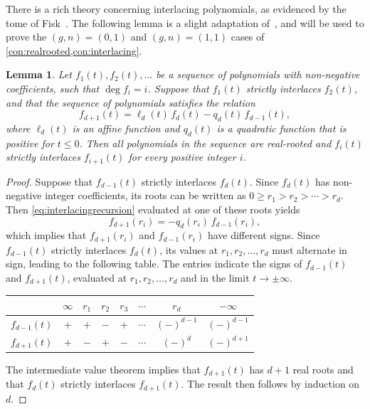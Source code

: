\documentclass[a4paper]{article}
\theoremstyle{plain}
\newtheorem{lemma}[theorem]{Lemma}
\numberwithin{theorem}{section}
\theoremstyle{definition}
\theoremstyle{remark}
\renewcommand{\leq}{\leqslant}
\renewcommand{\geq}{\geqslant}
\begin{document}
There is a rich theory concerning interlacing polynomials, as evidenced by the tome of Fisk~\cite{fis06}. The following lemma is a slight adaptation of~\cite[Lemma~1.82]{fis06}, and will be used to prove the $(g,n) = (0,1)$ and $(g,n) = (1,1)$ cases of \cref{con:realrooted,con:interlacing}.


\begin{lemma} \label{lem:interlacing}
Let $f_1(t), f_2(t), \ldots$ be a sequence of polynomials with non-negative coefficients, such that $\deg f_i = i$. Suppose that $f_1(t)$ strictly interlaces $f_2(t)$, and that the sequence of polynomials satisfies the relation
\begin{equation} \label{eq:interlacingrecursion}
f_{d+1}(t) = \ell_d(t) \, f_{d}(t) - q_d(t) \, f_{d-1}(t),
\end{equation}
where $\ell_d(t)$ is an affine function and $q_d(t)$ is a quadratic function that is positive for $t \leq 0$. Then all polynomials in the sequence are real-rooted and $f_i(t)$ strictly interlaces $f_{i+1}(t)$ for every positive integer $i$.
\end{lemma}


\begin{proof}
Suppose that $f_{d-1}(t)$ strictly interlaces $f_d(t)$. Since $f_d(t)$ has non-negative integer coefficients, its roots can be written as $0 \geq r_1 > r_2 > \cdots > r_d$. Then \cref{eq:interlacingrecursion} evaluated at one of these roots yields
\[
f_{d+1}(r_i) = - q_d(r_i) \, f_{d-1}(r_i),
\]
which implies that $f_{d+1}(r_i)$ and $f_{d-1}(r_i)$ have different signs. Since $f_{d-1}(t)$ strictly interlaces $f_d(t)$, its values at $r_1, r_2, \ldots, r_d$ must alternate in sign, leading to the following table. The entries indicate the signs of $f_{d-1}(t)$ and $f_{d+1}(t)$, evaluated at $r_1, r_2, \ldots, r_d$ and in the limit $t \to \pm\infty$.


\begin{center}
\begin{tabular}{cccccccc} \toprule
 & $\infty$ & $r_1$ & $r_2$ & $r_3$ & $\cdots$ & $r_d$ & $-\infty$ \\ \midrule
$f_{d-1}(t)$ & $+$ & $+$ & $-$ & $+$& $\cdots$ & $(-)^{d-1}$ & $(-)^{d-1}$ \\
$f_{d+1}(t)$ & $+$ & $-$ & $+$ & $-$ & $\cdots$ & $(-)^d$ & $(-)^{d+1}$ \\ \bottomrule
\end{tabular}
\end{center}


The intermediate value theorem implies that $f_{d+1}(t)$ has $d+1$ real roots and that $f_d(t)$ strictly interlaces $f_{d+1}(t)$. The result then follows by induction on $d$.
\end{proof}
\end{document}
